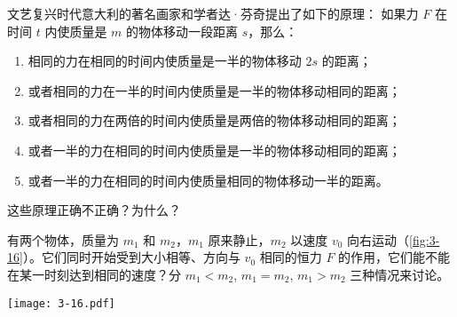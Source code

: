 \begin{Exercise}
\begin{question}

\item 文艺复兴时代意大利的著名画家和学者达·芬奇提出了如下的原理：
    如果力 $F$ 在时间 $t$ 内使质量是 $m$ 的物体移动一段距离
$s$，那么：
\begin{enumerate}
  \item  相同的力在相同的时间内使质量是一半的物体移动 $2s$ 的距离；
  \item  或者相同的力在一半的时间内使质量是一半的物体移动相同的距离；
  \item  或者相同的力在两倍的时间内使质量是两倍的物体移动相同的距离；
  \item  或者一半的力在相同的时间内使质量是一半的物体移动相同的距离；
  \item  或者一半的力在相同的时间内使质量相同的物体移动一半的距离。
\end{enumerate}
    这些原理正确不正确？为什么？

\item   有两个物体，质量为 $m_1$ 和 $m_2$，$m_1$ 原来静止，$m_2$ 以速度 $v_0$ 向右运动（\cref{fig:3-16}）。它们同时开始受到大小相等、方向与 $v_0$ 相同的恒力 $F$ 的作用，它们能不能在某一时刻达到相同的速度？分 $m_1<m_2$, $m_1=m_2$, $m_1>m_2$ 三种情况来讨论。
\begin{figurehere}
  \begin{minipage}{\linewidth}\centering
    \texttt{[image: 3-16.pdf]}
    \caption{}\label{fig:3-16}
  \end{minipage}
\end{figurehere}
\end{question}
\end{Exercise}
